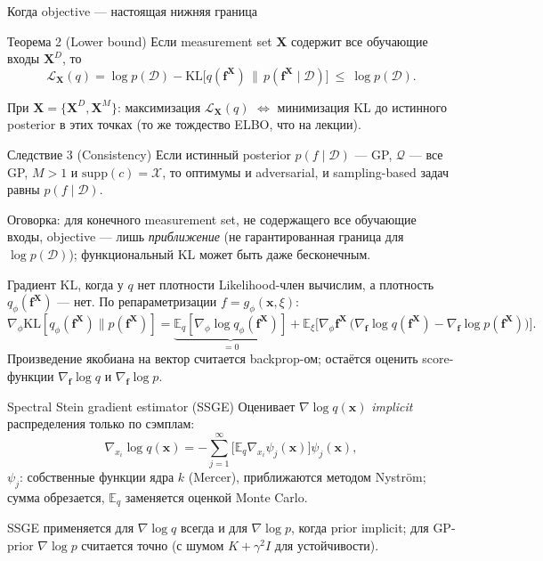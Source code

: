 \documentclass[aspectratio=169,9pt]{beamer}
\newcommand{\E}{\mathbb{E}}
\newcommand{\KL}{\mathrm{KL}}
\newcommand{\fx}{\mathbf{f}^{\mathbf{X}}}
\newcommand{\bx}{\mathbf{X}}
\begin{document}
\begin{frame}{Когда objective --- настоящая нижняя граница}
  \begin{block}{Теорема 2 (Lower bound)}
    Если measurement set $\bx$ содержит все обучающие входы $\bx^{D}$, то
    \[
      \mathcal L_{\bx}(q)=\log p(\mathcal D)-\KL\big[q(\fx)\,\|\,p(\fx\mid\mathcal D)\big]\ \le\ \log p(\mathcal D).
    \]
  \end{block}
  При $\bx=\{\bx^D,\bx^M\}$: максимизация $\mathcal L_{\bx}(q)$ $\Leftrightarrow$ минимизация KL до истинного posterior в этих точках (то же тождество ELBO, что на лекции).

  \begin{block}{Следствие 3 (Consistency)}
    Если истинный posterior $p(f\mid\mathcal D)$ --- GP, $\mathcal Q$ --- все GP, $M>1$ и $\mathrm{supp}(c)=\mathcal X$, то оптимумы и adversarial, и sampling-based задач равны $p(f\mid\mathcal D)$.
  \end{block}
  Оговорка: для конечного measurement set, не содержащего все обучающие входы, objective --- лишь \emph{приближение} (не гарантированная граница для $\log p(\mathcal D)$); функциональный KL может быть даже бесконечным.
\end{frame}

\begin{frame}{Градиент KL, когда у $q$ нет плотности}
  \small
  Likelihood-член вычислим, а плотность $q_\phi(\fx)$ --- нет. По репараметризации $f=g_\phi(\mathbf x,\xi)$:
  \[
    \nabla_\phi\KL[q_\phi(\fx)\|p(\fx)]
    =\underbrace{\E_q[\nabla_\phi\log q_\phi(\fx)]}_{=0}
    +\E_\xi\Big[\nabla_\phi\fx\,\big(\nabla_{\mathbf f}\log q(\fx)-\nabla_{\mathbf f}\log p(\fx)\big)\Big].
  \]
  Произведение якобиана на вектор считается backprop-ом; остаётся оценить score-функции $\nabla_{\mathbf f}\log q$ и $\nabla_{\mathbf f}\log p$.

  \begin{block}{Spectral Stein gradient estimator (SSGE)}
    Оценивает $\nabla\log q(\mathbf x)$ \emph{implicit} распределения только по сэмплам:
    \[
      \nabla_{x_i}\log q(\mathbf x)=-\sum_{j=1}^{\infty}\big[\E_q\nabla_{x_i}\psi_j(\mathbf x)\big]\psi_j(\mathbf x),
    \]
    $\psi_j$: собственные функции ядра $k$ (Mercer), приближаются методом Nystr\"om; сумма обрезается, $\E_q$ заменяется оценкой Monte Carlo.
  \end{block}
  SSGE применяется для $\nabla\log q$ всегда и для $\nabla\log p$, когда prior implicit; для GP-prior $\nabla\log p$ считается точно (с шумом $K+\gamma^2I$ для устойчивости).
\end{frame}
\end{document}
